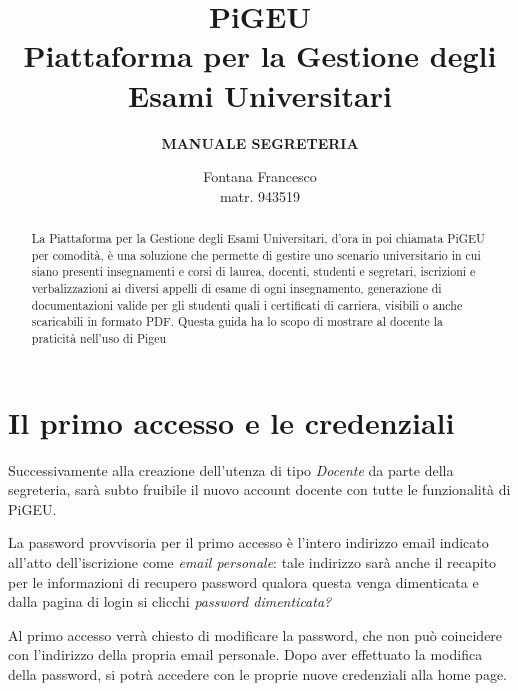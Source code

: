 \documentclass{article}
\title{PiGEU\\ Piattaforma per la Gestione degli Esami Universitari}
\author{\textbf{MANUALE SEGRETERIA}}
\date{Fontana Francesco \\ matr. 943519}
\begin{document}
    \maketitle

    \begin{abstract}

        La Piattaforma per la Gestione degli Esami Universitari, d'ora in poi chiamata PiGEU per comodità, è una soluzione che permette di gestire
        uno scenario universitario in cui siano presenti insegnamenti e corsi di laurea, docenti, studenti e segretari, iscrizioni e verbalizzazioni
        ai diversi appelli di esame di ogni insegnamento, generazione di documentazioni valide per gli studenti quali i certificati di carriera, visibili
        o anche scaricabili in formato PDF.
        Questa guida ha lo scopo di mostrare al docente la praticità nell'uso di Pigeu
    \end{abstract}

    \pagebreak

    \tableofcontents

    \pagebreak

    \section{Il primo accesso e le credenziali}
    Successivamente alla creazione dell'utenza di tipo \textit{Docente} da parte della segreteria, sarà subto fruibile il nuovo account docente con tutte le funzionalità di PiGEU.

    La password provvisoria per il primo accesso è l'intero indirizzo email indicato all'atto dell'iscrizione come \textit{email personale}: tale indirizzo sarà anche il recapito per le informazioni di recupero password qualora questa venga dimenticata e dalla pagina di login si clicchi \textit{password dimenticata?}

    Al primo accesso verrà chiesto di modificare la password, che non può coincidere con l'indirizzo della propria email personale. Dopo aver effettuato la modifica della password, si potrà accedere con le proprie nuove credenziali alla home page.
\end{document}
